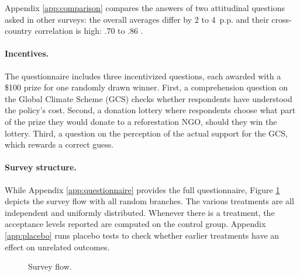 \documentclass[12pt,english]{article}
\begin{document}
\begin{bibunit}
Appendix \ref{app:comparison} compares the answers of two attitudinal questions asked in other surveys: the overall averages differ by 2 to 4~p.p. and their cross-country correlation is high: .70 \citep{global_nation_global_2023} to .86 \citep{cappelen_majority_2025}. 

\paragraph{Incentives.}
The questionnaire includes three incentivized questions, each awarded with a \$100 prize for one randomly drawn winner. First, a comprehension question on the Global Climate Scheme (GCS) checks whether respondents have understood the policy's cost. %
Second, a donation lottery where respondents choose what part of the prize they would donate to a reforestation NGO, should they win the lottery. Third, a question on the perception of the actual support for the GCS, which rewards a correct guess.

\paragraph{Survey structure.}
While Appendix \ref{app:questionnaire} provides the full questionnaire, Figure \ref{fig:flow} depicts the survey flow with all random branches. The various treatments are all independent and uniformly distributed. Whenever there is a treatment, the acceptance levels reported are computed on the control group. Appendix \ref{app:placebo} runs placebo tests to check whether earlier treatments have an effect on unrelated outcomes. 
\begin{figure}[h!]
    \caption[Survey flow]{Survey flow.
    }\label{fig:flow}
\end{figure}


\end{bibunit}
\end{document}
